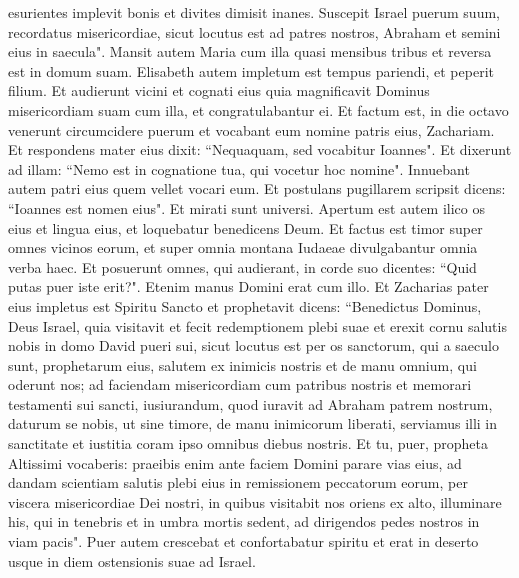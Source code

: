 \begin{biblechapter}
\verse esurientes implevit bonis et divites dimisit inanes. 
\verse Suscepit Israel puerum suum, recordatus misericordiae, 
\verse sicut locutus est ad patres nostros, Abraham et semini eius in saecula". 
\verse Mansit autem Maria cum illa quasi mensibus tribus et reversa est in domum suam. 
\verse Elisabeth autem impletum est tempus pariendi, et peperit filium.  
\verse Et audierunt vicini et cognati eius quia magnificavit Dominus misericordiam suam cum illa, et congratulabantur ei. 
\verse Et factum est, in die octavo venerunt circumcidere puerum et vocabant eum nomine patris eius, Zachariam.  
\verse Et respondens mater eius dixit: “Nequaquam, sed vocabitur Ioannes". 
\verse Et dixerunt ad illam: “Nemo est in cognatione tua, qui vocetur hoc nomine". 
\verse Innuebant autem patri eius quem vellet vocari eum. 
\verse Et postulans pugillarem scripsit dicens: “Ioannes est nomen eius". Et mirati sunt universi.  
\verse Apertum est autem ilico os eius et lingua eius, et loquebatur benedicens Deum. 
\verse Et factus est timor super omnes vicinos eorum, et super omnia montana Iudaeae divulgabantur omnia verba haec. 
\verse Et posuerunt omnes, qui audierant, in corde suo dicentes: “Quid putas puer iste erit?". Etenim manus Domini erat cum illo. 
\verse Et Zacharias pater eius impletus est Spiritu Sancto et prophetavit dicens: 
\verse “Benedictus Dominus, Deus Israel, quia visitavit et fecit redemptionem plebi suae 
\verse et erexit cornu salutis nobis in domo David pueri sui, 
\verse sicut locutus est per os sanctorum, qui a saeculo sunt, prophetarum eius, 
\verse salutem ex inimicis nostris et de manu omnium, qui oderunt nos; 
\verse ad faciendam misericordiam cum patribus nostris et memorari testamenti sui sancti, 
\verse iusiurandum, quod iuravit ad Abraham patrem nostrum, daturum se nobis, 
\verse ut sine timore, de manu inimicorum liberati, serviamus illi 
\verse in sanctitate et iustitia coram ipso omnibus diebus nostris. 
\verse Et tu, puer, propheta Altissimi vocaberis: praeibis enim ante faciem Domini parare vias eius, 
\verse ad dandam scientiam salutis plebi eius in remissionem peccatorum eorum, 
\verse per viscera misericordiae Dei nostri, in quibus visitabit nos oriens ex alto, 
\verse illuminare his, qui in tenebris et in umbra mortis sedent, ad dirigendos pedes nostros in viam pacis". 
\verse Puer autem crescebat et confortabatur spiritu et erat in deserto usque in diem ostensionis suae ad Israel. 
\end{biblechapter}

